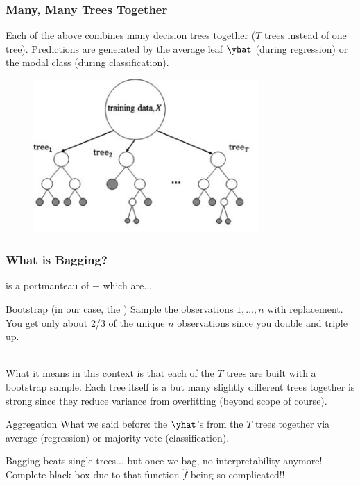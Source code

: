 \documentclass[handout]{beamer}
\begin{document}
\begin{frame}\frametitle{Many, Many Trees Together}
\small
Each of the above combines many decision trees together ($T$ trees instead of one tree). Predictions are generated by the average leaf $\yhat$ (during regression) or the modal class (during classification).

\begin{figure}
\centering
\includegraphics[width=3.4in]{tree_average.png}
\end{figure}
\end{frame}

\begin{frame}\frametitle{What is Bagging?}
\small 
{} is a portmanteau of  +  which are...\pause 

\begin{block}{Bootstrap (in our case, the )} \pause 
Sample the observations $1,\ldots,n$ with replacement. \pause You get only about 2/3 of the unique $n$ observations since you double and triple up.\\~\\ \pause 

What it means in this context is that each of the $T$ trees are built with a bootstrap sample. \pause Each tree itself is a  but many slightly different trees together is strong since they reduce variance from overfitting (beyond scope of course).\pause
\end{block}

\begin{block}{Aggregation}
What we said before:  the $\yhat$'s from the $T$ trees together via average (regression) or majority vote (classification). \pause 
\end{block}

Bagging beats single trees... but once we bag, no interpretability anymore! Complete black box due to that function $\hat{f}$ being so complicated!!

\end{frame}
\end{document}
